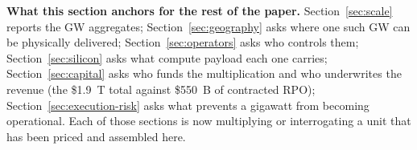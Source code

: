 \textbf{What this section anchors for the rest of the paper.} Section~\ref{sec:scale} reports the GW aggregates; Section~\ref{sec:geography} asks where one such GW can be physically delivered; Section~\ref{sec:operators} asks who controls them; Section~\ref{sec:silicon} asks what compute payload each one carries; Section~\ref{sec:capital} asks who funds the multiplication and who underwrites the revenue (the \$1.9~T total against \$550~B of contracted RPO); Section~\ref{sec:execution-risk} asks what prevents a gigawatt from becoming operational. Each of those sections is now multiplying or interrogating a unit that has been priced and assembled here.
